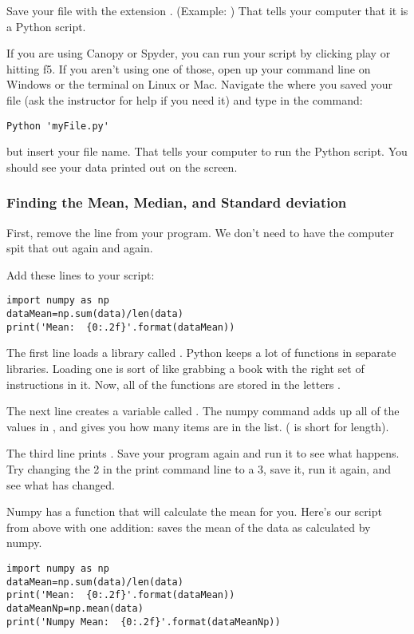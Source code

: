\documentclass[twoside,11pt,ShortChapTitles]{BYUTextbook}
\begin{document}
Save your file with the extension . (Example: )  That tells your computer that it is a Python script.

If you are using Canopy or Spyder, you can run your script by clicking play or hitting f5.  If you aren't using one of those, open up your command line on Windows or the terminal on Linux or Mac.  Navigate the where you saved your file (ask the instructor for help if you need it) and type in the command:
\begin{Verbatim}
Python 'myFile.py'
\end{Verbatim}
but insert your file name. That tells your computer to run the Python script.  You should see your data printed out on the screen.

\subsubsection{Finding the Mean, Median, and Standard deviation}

First, remove the  line from your program. We don't need to have the computer spit that out again and again.

Add these lines to your script:
\begin{Verbatim}
import numpy as np
dataMean=np.sum(data)/len(data)
print('Mean:  {0:.2f}'.format(dataMean))
\end{Verbatim}

The first line loads a library called .  Python keeps a lot of functions in separate libraries.  Loading one is sort of like grabbing a book with the right set of instructions in it.  Now, all of the  functions are stored in the letters .

The next line creates a variable called . The numpy  command adds up all of the values in , and  gives you how many items are in the  list. ( is short for length).

The third line prints .  Save your program again and run it to see what happens.  Try changing the 2 in the print command line to a 3, save it, run it again, and see what has changed.

Numpy has a function that will calculate the mean for you.  Here's our script from above with one addition:  saves the mean of the data as calculated by numpy.
\begin{Verbatim}
import numpy as np
dataMean=np.sum(data)/len(data)
print('Mean:  {0:.2f}'.format(dataMean))
dataMeanNp=np.mean(data)
print('Numpy Mean:  {0:.2f}'.format(dataMeanNp))
\end{Verbatim}
\end{document}
